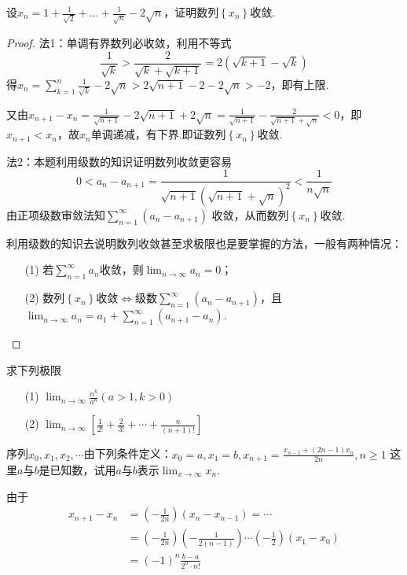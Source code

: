 \begin{xiti}
\begin{solution}
\end{solution}
\item 设$x _ { n } = 1 + \frac { 1 } { \sqrt { 2 } } + \dots + \frac { 1 } { \sqrt { n } } - 2 \sqrt { n }$，证明数列$\left\lbrace x_{n}\right\rbrace $收敛.
\begin{proof}
法1：单调有界数列必收敛，利用不等式
\[
\frac{1}{\sqrt{k}}>\frac{2}{\sqrt{k}+\sqrt{k+1}}=2(\sqrt{k+1}-\sqrt{k})
\]
得$x_{n}=\sum_{k=1}^{n} \frac{1}{\sqrt{k}}-2 \sqrt{n}>2 \sqrt{n+1}-2-2 \sqrt{n}>-2$，即有上限.

又由$x_{n+1}-x_{n}=\frac{1}{\sqrt{n+1}}-2 \sqrt{n+1}+2 \sqrt{n}=\frac{1}{\sqrt{n+1}}-\frac{2}{\sqrt{n+1}+\sqrt{n}}<0$，即$x_{n+1}<x_{n}$，故$ x_{n} $单调递减，有下界.即证数列$\left\lbrace x_{n}\right\rbrace $收敛.

法2：本题利用级数的知识证明数列收敛更容易
\[
0<a_{n}-a_{n+1}=\frac{1}{\sqrt{n+1}(\sqrt{n+1}+\sqrt{n})^{2}}<\frac{1}{n \sqrt{n}}
\]
由正项级数审敛法知$\sum_{n=1}^{\infty}\left(a_{n}-a_{n+1}\right)$ 收敛，从而数列$\left\lbrace x_{n}\right\rbrace $收敛.
\begin{note}
利用级数的知识去说明数列收敛甚至求极限也是要掌握的方法，一般有两种情况：
\begin{enumerate}
	\item[(1)]若$\sum_{n=1}^{\infty} a_{n}$收敛，则$\lim _{n \rightarrow \infty} a_{n}=0$；
	\item[(2)] 数列$\left\lbrace x_{n}\right\rbrace $收敛$\Leftrightarrow$级数$\sum_{n=1}^{\infty}\left(a_{n}-a_{n+1}\right)$，且$\lim _{n \rightarrow \infty} a_{n}=a_{1}+\sum_{n=1}^{\infty}\left(a_{n+1}-a_{n}\right)$.
\end{enumerate}
\end{note}
\end{proof}
\item 求下列极限
\begin{enumerate}
	\item[(1)] $\lim _ { n \rightarrow \infty } \frac { n ^ { k } } { a ^ { n } } ( a > 1 , k > 0 )$
	\item[(2)] $\lim _ { n \rightarrow \infty } \left[ \frac { 1 } { 2 ! } + \frac { 2 } { 3 ! } + \cdots + \frac { n } { ( n + 1 ) ! } \right]$
\end{enumerate}
\item 序列$x _ { 0 } , x _ { 1 } , x _ { 2 } , \cdots$由下列条件定义：$x _ { 0 } = a , x _ { 1 } = b , x _ { n + 1 } = \frac { x _ { n - 1 } + ( 2 n - 1 ) x _ { n } } { 2 n } , n \geqslant 1$
\noindent 这里$a$与$b$是已知数，试用$a$与$b$表示$\lim_{ x \rightarrow \infty }x_{n}$.
\begin{solution}
	由于\begin{align*} 
	x_{n+1}-x_{n} &=\left(-\frac{1}{2 n}\right)\left(x_{n}-x_{n-1}\right)=\cdots \\ &=\left(-\frac{1}{2 n}\right)\left(-\frac{1}{2(n-1)}\right) \cdots\left(-\frac{1}{2}\right)\left(x_{1}-x_{0}\right) \\ &=(-1)^{n} \frac{b-a}{2^{n} \cdot n !} 
	\end{align*}
	

\end{solution}
\end{xiti}
